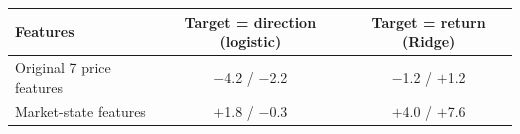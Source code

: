 \begin{tabular}{lcc}
\toprule
Features & Target = direction (logistic) & Target = return (Ridge) \\
\midrule
Original 7 price features & $-$4.2 / $-$2.2 & $-$1.2 / $+$1.2 \\
Market-state features & $+$1.8 / $-$0.3 & $+$4.0 / $+$7.6 \\
\bottomrule
\end{tabular}
